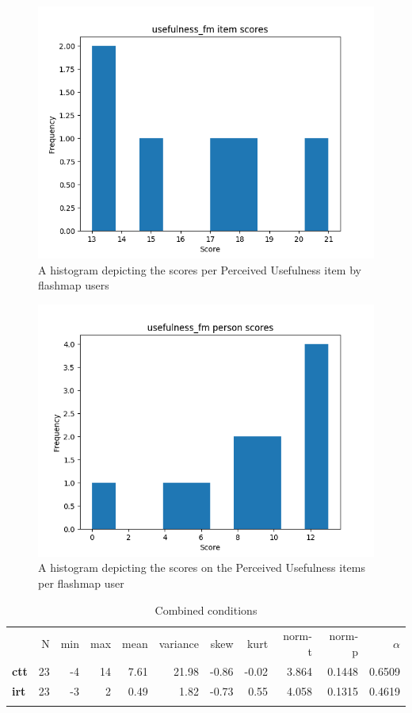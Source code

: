 \begin{figure}
    \includegraphics[width=\textwidth]{img/usefulness_fm_diff.png}
    \caption{A histogram depicting the scores per Perceived Usefulness item by flashmap users}
    \label{fig:usefulness_fm_diff}
\end{figure}
\begin{figure}
    \includegraphics[width=\textwidth]{img/usefulness_fm_abil.png}
    \caption{A histogram depicting the scores on the Perceived Usefulness items per flashmap user}
    \label{fig:usefulness_fm_abil}
\end{figure}

\begin{longtable}[c]{@{}lrrrrrrrrrr@{}}
\caption{Combined conditions}
\endfirsthead
\toprule\addlinespace
& N & min & max & mean & variance & skew & kurt & norm-t &
norm-p & $\alpha$
\\\addlinespace
\midrule
\textbf{ctt} & 23 & -4 & 14 & 7.61 & 21.98 & -0.86 & -0.02 & 3.864 &
0.1448 & 0.6509
\\\addlinespace
\textbf{irt} & 23 & -3 & 2 & 0.49 & 1.82 & -0.73 & 0.55 & 4.058 & 0.1315
& 0.4619
\\\addlinespace
\bottomrule
    \label{tab:usefulness_gen}
\end{longtable}

